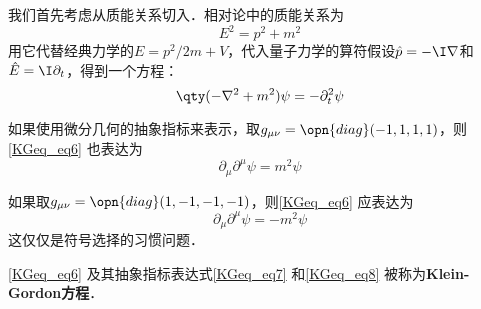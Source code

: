 我们首先考虑从质能关系切入．相对论中的质能关系为
\begin{equation}
E^2=p^2+m^2
\end{equation}
用它代替经典力学的$E=p^2/2m+V$，代入量子力学的算符假设$\hat{p}=-\I\nabla$和$\hat{E}=\I\partial_t$，得到一个方程：
\begin{equation}\label{KGeq_eq6}
\qty(-\nabla^2+m^2)\psi = -\partial_t^2 \psi
\end{equation}

如果使用微分几何的抽象指标来表示，取$g_{\mu\nu}=\opn{diag}(-1, 1, 1, 1)$，则\autoref{KGeq_eq6} 也表达为
\begin{equation}\label{KGeq_eq7}
\partial_\mu\partial^\mu \psi = m^2\psi
\end{equation}

如果取$g_{\mu\nu}=\opn{diag}(1, -1, -1, -1)$，则\autoref{KGeq_eq6} 应表达为
\begin{equation}\label{KGeq_eq8}
\partial_\mu\partial^\mu \psi = -m^2\psi
\end{equation}
这仅仅是符号选择的习惯问题．

\autoref{KGeq_eq6} 及其抽象指标表达式\autoref{KGeq_eq7} 和\autoref{KGeq_eq8} 被称为\textbf{Klein-Gordon方程}．















